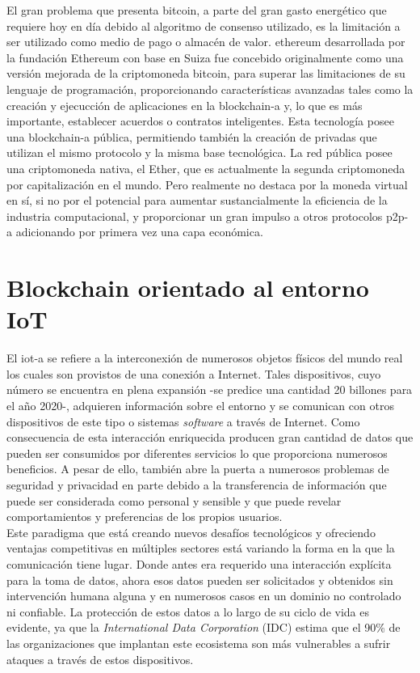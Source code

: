 \documentclass[12pt,a4paper, twoside]{report}
\begin{document}
	El gran problema que presenta \gls{bitcoin}, a parte del gran gasto energético que requiere hoy en día debido al algoritmo de consenso utilizado, es la limitación a ser utilizado como medio de pago o almacén de valor. \gls{ethereum} desarrollada por la fundación Ethereum con base en Suiza fue concebido originalmente como una versión mejorada de la criptomoneda \gls{bitcoin}, para superar las limitaciones de su lenguaje de programación, proporcionando características avanzadas tales como la creación y ejecucción de aplicaciones en la \gls{blockchain-a} y, lo que es más importante, establecer acuerdos o contratos inteligentes. Esta tecnología posee una \gls{blockchain-a} pública, permitiendo también la creación de privadas que utilizan el mismo protocolo y la misma base tecnológica. La red pública posee una criptomoneda nativa, el Ether, que es actualmente la segunda criptomoneda por capitalización en el mundo. Pero realmente no destaca por la moneda virtual en sí, si no por el potencial para aumentar sustancialmente la eficiencia de la industria computacional, y proporcionar un gran impulso a otros protocolos \gls{p2p-a} adicionando por primera vez una capa económica.

	\section{Blockchain orientado al entorno IoT}
	
	El \gls{iot-a} se refiere a la interconexión de numerosos objetos físicos del mundo real los cuales son provistos de una conexión a Internet. Tales dispositivos, cuyo número se encuentra en plena expansión -se predice una cantidad 20 billones para el año 2020-, adquieren información sobre el entorno y se comunican con otros dispositivos de este tipo o sistemas \textit{software} a través de Internet. Como consecuencia de esta interacción enriquecida producen gran cantidad de datos que pueden ser consumidos por diferentes servicios lo que proporciona numerosos beneficios. A pesar de ello, también abre la puerta a numerosos problemas de seguridad y privacidad en parte debido a la transferencia de información que puede ser considerada como personal y sensible y que puede revelar comportamientos y preferencias de los propios usuarios. \\
	
	Este paradigma que está creando nuevos desafíos tecnológicos y ofreciendo ventajas competitivas en múltiples sectores está variando la forma en la que la comunicación tiene lugar. Donde antes era requerido una interacción explícita para la toma de datos, ahora esos datos pueden ser solicitados y obtenidos sin intervención humana alguna y en numerosos casos en un dominio no controlado ni confiable. La protección de estos datos a lo largo de su ciclo de vida es evidente, ya que la \textit{International Data Corporation} (IDC) estima que el 90\% de las organizaciones que implantan este ecosistema son más vulnerables a sufrir ataques a través de estos dispositivos. \\
	
\end{document}
